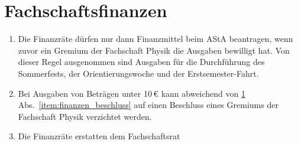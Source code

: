 \section{Fachschaftsfinanzen}
\label{sec:finanzen}
\begin{enumerate}
	\item \label{item:finanzen_beschluss}
Die Finanzräte dürfen nur dann Finanzmittel beim AStA beantragen, wenn zuvor ein Gremium der Fachschaft Physik die Ausgaben bewilligt hat.
	Von dieser Regel ausgenommen sind Ausgaben für die Durchführung des Sommerfests, der Orientierungswoche und der Erstsemester-Fahrt.
	\item Bei Ausgaben von Beträgen unter 10\,€ kann abweichend von \ref{sec:finanzen} Abs.~\ref{item:finanzen_beschluss} auf einen Beschluss eines Gremiums der Fachschaft Physik verzichtet werden.
	\item Die Finanzräte erstatten dem Fachschaftsrat 
\end{enumerate}

